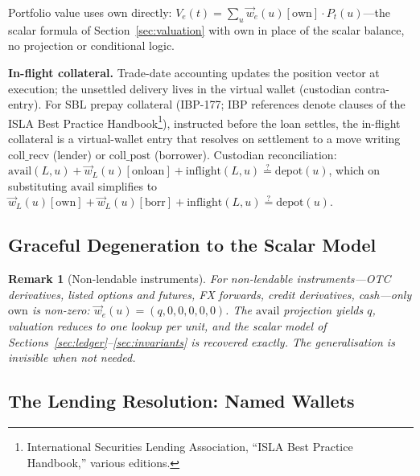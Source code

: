 \documentclass[11pt,a4paper]{article}
\newtheorem{remark}[definition]{Remark}
\begin{document}
\noindent Portfolio value uses $\mathrm{own}$ directly: $V_e(t) = \sum_{u} \vec{w}_e(u)[\mathrm{own}]\cdot P_t(u)$---the scalar formula of Section~\ref{sec:valuation} with $\mathrm{own}$ in place of the scalar balance, no projection or conditional logic.

\noindent\textbf{In-flight collateral.} Trade-date accounting updates the position vector at execution; the unsettled delivery lives in the virtual wallet (custodian contra-entry). For SBL prepay collateral (IBP-177; IBP references denote clauses of the ISLA Best Practice Handbook\footnote{International Securities Lending Association, ``ISLA Best Practice Handbook,'' various editions.}), instructed before the loan settles, the in-flight collateral is a virtual-wallet entry that resolves on settlement to a move writing $\mathrm{coll\_recv}$ (lender) or $\mathrm{coll\_post}$ (borrower). Custodian reconciliation: $\mathrm{avail}(L,u) + \vec{w}_L(u)[\mathrm{onloan}] + \mathrm{inflight}(L,u) \stackrel{?}{=} \text{depot}(u)$, which on substituting $\mathrm{avail}$ simplifies to $\vec{w}_L(u)[\mathrm{own}] + \vec{w}_L(u)[\mathrm{borr}] + \mathrm{inflight}(L,u) \stackrel{?}{=} \text{depot}(u)$.

\subsection{Graceful Degeneration to the Scalar Model}
\label{sec:degeneration}

\begin{remark}[Non-lendable instruments]
For non-lendable instruments---OTC derivatives, listed options and futures, FX forwards, credit derivatives, cash---only $\mathrm{own}$ is non-zero: $\vec{w}_e(u) = (q,0,0,0,0,0)$. The $\mathrm{avail}$ projection yields $q$, valuation reduces to one lookup per unit, and the scalar model of Sections~\ref{sec:ledger}--\ref{sec:invariants} is recovered exactly. The generalisation is invisible when not needed.
\end{remark}

\subsection{The Lending Resolution: Named Wallets}
\label{sec:named-wallets}
\end{document}
